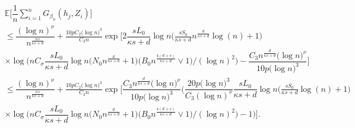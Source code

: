 \documentclass[10pt,twoside]{article}
\numberwithin{equation}{section}
\newcommand{\E}{\ensuremath{\mathbb{E}}}
\begin{document}
\begin{align}%
\nonumber & \E\Big[\dfrac{1}{n}\sum_{i = 1}^n G_{\beta_n}(h_{j}, Z_i) \Big] \\
& \leq  \dfrac{(\log n)^{\nu}}{ n^{\frac{\kappa s}{\kappa s + d} } } + \frac{10 p C_2 \big(\log n\big)^3}{C_3 n}  \exp\Bigg[2\dfrac{s L_0}{\kappa s + d} \log n \Big(\frac{s S_0}{\kappa s + d} n^{\frac{d}{\kappa s + d}}\log (n) + 1 \Big) \\ 
%
\nonumber & \times \log\Big(n C_{\sigma} \dfrac{s L_0}{\kappa s + d} \log n \big(N_0 n^{\frac{d}{\kappa s + d}} + 1 \big) \big(B_0 n^{\frac{4(d + s)}{\kappa s + d}} \lor 1 \big) /(\log n)^2 \Big) - \dfrac{C_3 n^{\frac{d}{\kappa s + d} } \big(\log n\big)^{\nu}}{10 p \big(\log n\big)^3}  \Bigg] 
\\
%
\nonumber &  \leq \dfrac{(\log n)^{\nu}}{ n^{\frac{\kappa s}{\kappa s + d} } } + \frac{10 p C_2 \big(\log n\big)^3}{C_3 n} \exp\Bigg[\dfrac{C_3 n^{\frac{d}{\kappa s + d} } \big(\log n\big)^{\nu}}{10 p \big(\log n\big)^3} \Bigg( \dfrac{20 p \big(\log n\big)^3}{C_3 (\log n)^{\nu} } \dfrac{s L_0}{\kappa s + d} \log n \Big(\frac{s S_0}{\kappa s + d} \log (n) + 1 \Big) \\ 
%
 & \times \log\Big(n C_{\sigma} \dfrac{s L_0}{\kappa s + d} \log n \big(N_0 n^{\frac{d}{\kappa s + d}} + 1 \big) \big(B_0 n^{\frac{4(d + s)}{\kappa s + d}} \lor 1 \big) /(\log n)^2 \Big) - 1 \Bigg) \Bigg].
\end{align}

\medskip
 
\end{document}
